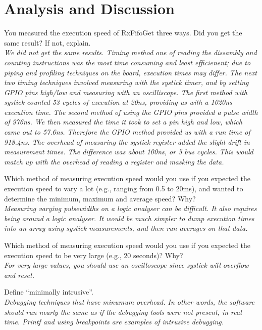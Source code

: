 \documentclass[11pt]{article}
\begin{document}
\vskip 0.25in

\section*{Analysis and Discussion}
\begin{pset}
  You measured the execution speed of RxFifo\textunderscore Get three ways. Did you get 
the same result? If not, explain.\\
\textit{We did not get the same results. Timing method one of reading the dissambly and counting instructions was the most time consuming and least efficienent; due to piping and profiling techniques on the board, execution times may differ. The next two timing techniques involved measuring with the systick timer, and by setting GPIO pins high/low and measuring with an oscilliscope. The first method with systick counted 53 cycles of execution at 20ns, providing us with a 1020ns execution time. The second method of using the GPIO pins provided a pulse width of 976ns. We then measured the time it took to set a pin high and low, which came out to 57.6ns. Therefore the GPIO method provided us with a run time of 918.4ns. The overhead of measuring the systick register added the slight drift in measurement times. The difference was about 100ns, or 5 bus cycles. This would match up with the overhead of reading a register and masking the data.}

  Which method of measuring execution speed would you use if you expected the execution speed to vary a lot (e.g., ranging from 0.5 to 20ms), and wanted to determine the minimum, maximum and average speed? Why?\\
\textit{Measuring varying pulsewidths on a logic analyser can be difficult. It also requires being around a logic analyser. It would be much simpler to dump execution times into an array using systick measurements, and then run averages on that data.}

  Which method of measuring execution speed would you use if you expected the execution speed to be very large (e.g., 20 seconds)? Why?\\
\textit{For very large values, you should use an oscilloscope since systick will overflow and reset.}

  Define “minimally intrusive”.\\
\textit{Debugging techniques that have minumum overhead. In other words, the software should run nearly the same as if the debugging tools were not present, in real time. Printf and using breakpoints are examples of intrusive debugging.}


\end{pset}
\end{document}
